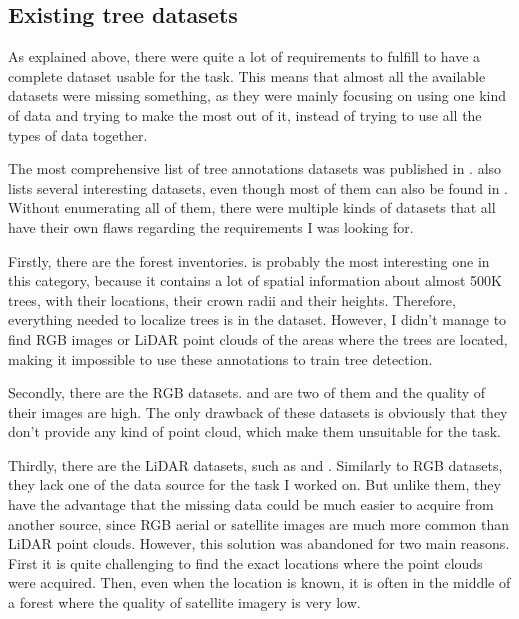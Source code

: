 \documentclass[
]{report}
\begin{document}
\subsection{Existing tree datasets}\label{existing-tree-datasets}

As explained above, there were quite a lot of requirements to fulfill to
have a complete dataset usable for the task. This means that almost all
the available datasets were missing something, as they were mainly
focusing on using one kind of data and trying to make the most out of
it, instead of trying to use all the types of data together.

The most comprehensive list of tree annotations datasets was published
in \textcite{OpenForest}. \textcite{FoMo-Bench} also lists several
interesting datasets, even though most of them can also be found in
\textcite{OpenForest}. Without enumerating all of them, there were
multiple kinds of datasets that all have their own flaws regarding the
requirements I was looking for.

Firstly, there are the forest inventories. \textcite{TALLO} is probably
the most interesting one in this category, because it contains a lot of
spatial information about almost 500K trees, with their locations, their
crown radii and their heights. Therefore, everything needed to localize
trees is in the dataset. However, I didn't manage to find RGB images or
LiDAR point clouds of the areas where the trees are located, making it
impossible to use these annotations to train tree detection.

Secondly, there are the RGB datasets. \textcite{ReforesTree} and
\textcite{MillionTrees} are two of them and the quality of their images
are high. The only drawback of these datasets is obviously that they
don't provide any kind of point cloud, which make them unsuitable for
the task.

Thirdly, there are the LiDAR datasets, such as \textcite{WildForest3D}
and \textcite{FOR-instance}. Similarly to RGB datasets, they lack one of
the data source for the task I worked on. But unlike them, they have the
advantage that the missing data could be much easier to acquire from
another source, since RGB aerial or satellite images are much more
common than LiDAR point clouds. However, this solution was abandoned for
two main reasons. First it is quite challenging to find the exact
locations where the point clouds were acquired. Then, even when the
location is known, it is often in the middle of a forest where the
quality of satellite imagery is very low.
\end{document}
